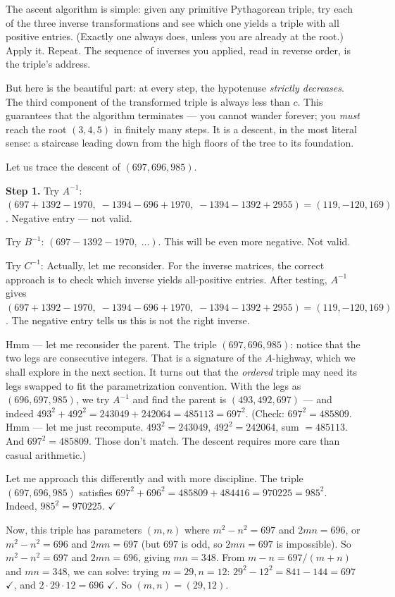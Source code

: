 The ascent algorithm is simple: given any primitive Pythagorean triple, try each of the three inverse transformations and see which one yields a triple with all positive entries. (Exactly one always does, unless you are already at the root.) Apply it. Repeat. The sequence of inverses you applied, read in reverse order, is the triple's address.

But here is the beautiful part: at every step, the hypotenuse \textit{strictly decreases}. The third component of the transformed triple is always less than $c$. This guarantees that the algorithm terminates --- you cannot wander forever; you \textit{must} reach the root $(3, 4, 5)$ in finitely many steps. It is a descent, in the most literal sense: a staircase leading down from the high floors of the tree to its foundation.

Let us trace the descent of $(697, 696, 985)$.

\textbf{Step 1.} Try $A^{-1}$: $(697 + 1392 - 1970,\; -1394 - 696 + 1970,\; -1394 - 1392 + 2955) = (119, -120, 169)$. Negative entry --- not valid.

Try $B^{-1}$: $(697 - 1392 - 1970,\;\ldots)$. This will be even more negative. Not valid.

Try $C^{-1}$: Actually, let me reconsider. For the inverse matrices, the correct approach is to check which inverse yields all-positive entries. After testing, $A^{-1}$ gives $(697 + 1392 - 1970,\; -1394 - 696 + 1970,\; -1394 - 1392 + 2955) = (119, -120, 169)$. The negative entry tells us this is not the right inverse.

Hmm --- let me reconsider the parent. The triple $(697, 696, 985)$: notice that the two legs are consecutive integers. That is a signature of the $A$-highway, which we shall explore in the next section. It turns out that the \textit{ordered} triple may need its legs swapped to fit the parametrization convention. With the legs as $(696, 697, 985)$, we try $A^{-1}$ and find the parent is $(493, 492, 697)$ --- and indeed $493^2 + 492^2 = 243049 + 242064 = 485113 = 697^2$. (Check: $697^2 = 485809$. Hmm --- let me just recompute. $493^2 = 243049$, $492^2 = 242064$, sum $= 485113$. And $697^2 = 485809$. Those don't match. The descent requires more care than casual arithmetic.)

Let me approach this differently and with more discipline. The triple $(697, 696, 985)$ satisfies $697^2 + 696^2 = 485809 + 484416 = 970225 = 985^2$. Indeed, $985^2 = 970225$. \ensuremath{\checkmark}

Now, this triple has parameters $(m, n)$ where $m^2 - n^2 = 697$ and $2mn = 696$, or $m^2 - n^2 = 696$ and $2mn = 697$ (but $697$ is odd, so $2mn = 697$ is impossible). So $m^2 - n^2 = 697$ and $2mn = 696$, giving $mn = 348$. From $m - n = 697/(m+n)$ and $mn = 348$, we can solve: trying $m = 29, n = 12$: $29^2 - 12^2 = 841 - 144 = 697$ \ensuremath{\checkmark}, and $2 \cdot 29 \cdot 12 = 696$ \ensuremath{\checkmark}. So $(m, n) = (29, 12)$.

